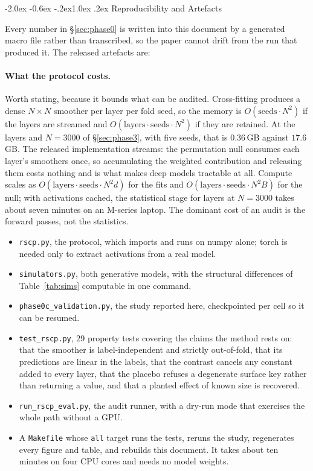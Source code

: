 \documentclass[10pt,twocolumn,letterpaper]{article}
\makeatletter
\renewcommand\section{\@startsection{section}{1}{\z@}%
  {-2.0ex \@plus -0.6ex \@minus -.2ex}{1.0ex \@plus .2ex}%
  {\normalfont\large\bfseries}}
\makeatother
\begin{document}
\section{Reproducibility and Artefacts}
\label{sec:repro}

Every number in \S\ref{sec:phase0} is written into this document by a
generated macro file rather than transcribed, so the paper cannot drift from
the run that produced it. The released artefacts are:

\paragraph{What the protocol costs.} Worth stating, because it bounds what can
be audited. Cross-fitting produces a dense $N\times N$ smoother per layer per
fold seed, so the memory is $O(\text{seeds}\cdot N^{2})$ if the layers are
streamed and $O(\text{layers}\cdot\text{seeds}\cdot N^{2})$ if they are
retained. At the \PthreeLayers{} layers and $N=3000$ of \S\ref{sec:phase3},
with five seeds, that is $0.36$\,GB against $17.6$\,GB. The released
implementation streams: the permutation null consumes each layer's smoothers
once, so accumulating the weighted contribution and releasing them costs
nothing and is what makes deep models tractable at all. Compute scales as
$O(\text{layers}\cdot\text{seeds}\cdot N^{2}d)$ for the fits and
$O(\text{layers}\cdot\text{seeds}\cdot N^{2}B)$ for the null; with activations
cached, the statistical stage for \PthreeLayers{} layers at $N=3000$ takes
about seven minutes on an M-series laptop. The dominant cost of an audit is
the forward passes, not the statistics.

\begin{itemize}\itemsep1pt
\item \texttt{rscp.py}, the protocol, which imports and runs on numpy alone;
      torch is needed only to extract activations from a real model.
\item \texttt{simulators.py}, both generative models, with the structural
      differences of Table~\ref{tab:sims} computable in one command.
\item \texttt{phase0c\_validation.py}, the study reported here, checkpointed
      per cell so it can be resumed.
\item \texttt{test\_rscp.py}, 29 property tests covering the claims the method
      rests on: that the smoother is label-independent and strictly
      out-of-fold, that its predictions are linear in the labels, that the
      contrast cancels any constant added to every layer, that the placebo
      refuses a degenerate surface key rather than returning a value, and that
      a planted effect of known size is recovered.
\item \texttt{run\_rscp\_eval.py}, the audit runner, with a dry-run mode that
      exercises the whole path without a GPU.
\item A \texttt{Makefile} whose \texttt{all} target runs the tests, reruns the
      study, regenerates every figure and table, and rebuilds this document.
      It takes about ten minutes on four CPU cores and needs no model weights.
\end{itemize}
\end{document}
